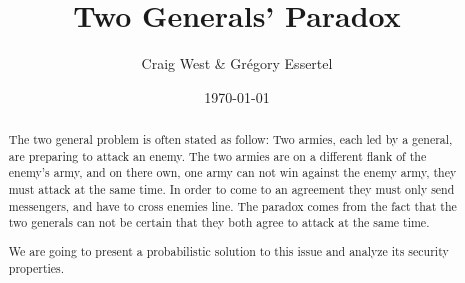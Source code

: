 \documentclass[10pt,letterpaper]{article}
\title{Two Generals' Paradox}
\author{ Craig West \& Gr\'egory Essertel
}
\date{\today}
\begin{document}
\maketitle

\begin{abstract}

    The two general problem is often stated as follow: Two armies, each led by a general, are preparing to attack an enemy. The two armies are on a different flank of the enemy's army, and on there own, one army can not
    win against the enemy army, they must attack at the same time. In order to come to an agreement they must only send messengers, and have to cross enemies line. The paradox comes from the fact that the two generals can not be
    certain that they both agree to attack at the same time.

    We are going to present a probabilistic solution to this issue and analyze its security properties.
\end{abstract}
\end{document}
